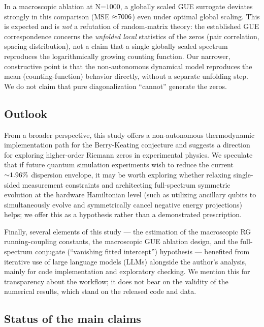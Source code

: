 \documentclass[fleqn,10pt]{wlscirep}
\begin{document}
In a macroscopic ablation at \(\text{N}\text{=1000}\), a globally scaled
GUE surrogate deviates strongly in this comparison (MSE
\(\text{\ensuremath{\approx}7006}\)) even under optimal global scaling. This is expected
and is \emph{not} a refutation of random-matrix theory: the established
GUE correspondence concerns the \emph{unfolded local} statistics of the
zeros (pair correlation, spacing distribution), not a claim that a single
globally scaled spectrum reproduces the logarithmically growing counting
function. Our narrower, constructive point is that the non-autonomous
dynamical model reproduces the mean (counting-function) behavior
directly, without a separate unfolding step. We do not claim that pure
diagonalization ``cannot'' generate the zeros.

\subsection*{Outlook}

From a broader perspective, this study offers a non-autonomous
thermodynamic implementation path
for the Berry-Keating conjecture and suggests a direction for
exploring higher-order Riemann zeros in experimental physics. We speculate
that if future quantum simulation experiments wish to reduce the
current \(\text{\ensuremath{\sim}1.96\%}\) dispersion envelope, it may be worth
exploring whether relaxing single-sided measurement constraints and
architecting full-spectrum symmetric evolution at the hardware Hamiltonian
level (such as utilizing ancillary qubits to simultaneously evolve and
symmetrically cancel negative energy projections) helps; we offer this as
a hypothesis rather than a demonstrated prescription.

Finally, several elements of this study --- the estimation of the
macroscopic RG running-coupling constants, the macroscopic GUE ablation
design, and the full-spectrum conjugate (``vanishing fitted intercept'')
hypothesis --- benefited from iterative use of large language models
(LLMs) alongside the author's analysis, mainly for code implementation
and exploratory checking. We mention this for transparency about the
workflow; it does not bear on the validity of the numerical results,
which stand on the released code and data.

\subsection*{Status of the main claims}
\end{document}
